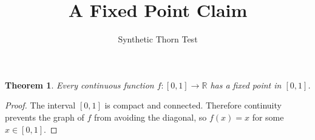 \documentclass{article}
\newtheorem{theorem}{Theorem}
\begin{document}
\title{A Fixed Point Claim}
\author{Synthetic Thorn Test}
\maketitle

\begin{theorem}\label{thm:false-as-stated}
Every continuous function $f:[0,1]\to\mathbb{R}$ has a fixed point in $[0,1]$.
\end{theorem}
\begin{proof}
The interval $[0,1]$ is compact and connected. Therefore continuity prevents the graph of $f$ from avoiding the diagonal, so $f(x)=x$ for some $x\in[0,1]$.
\end{proof}
\end{document}
